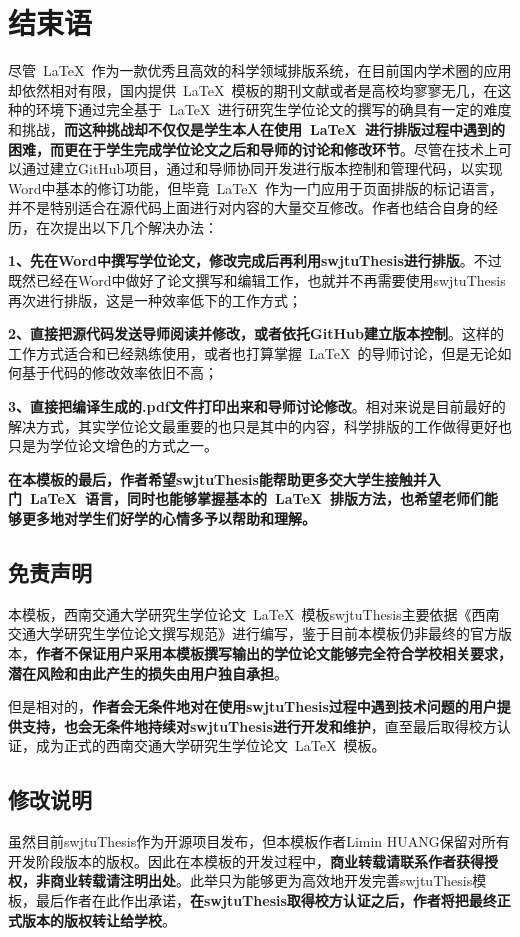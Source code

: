 \chapter{结束语}\label{第4章}

尽管~\LaTeX{}~作为一款优秀且高效的科学领域排版系统，在目前国内学术圈的应用却依然相对有限，国内提供~\LaTeX{}~模板的期刊文献或者是高校均寥寥无几，在这种的环境下通过完全基于~\LaTeX{}~进行研究生学位论文的撰写的确具有一定的难度和挑战，\textbf{而这种挑战却不仅仅是学生本人在使用~\LaTeX{}~进行排版过程中遇到的困难，而更在于学生完成学位论文之后和导师的讨论和修改环节}。尽管在技术上可以通过建立GitHub项目，通过和导师协同开发进行版本控制和管理代码，以实现Word中基本的修订功能，但毕竟~\LaTeX{}~作为一门应用于页面排版的标记语言，并不是特别适合在源代码上面进行对内容的大量交互修改。作者也结合自身的经历，在次提出以下几个解决办法：

\textbf{1、先在Word中撰写学位论文，修改完成后再利用swjtuThesis进行排版}。不过既然已经在Word中做好了论文撰写和编辑工作，也就并不再需要使用swjtuThesis再次进行排版，这是一种效率低下的工作方式；

\textbf{2、直接把源代码发送导师阅读并修改，或者依托GitHub建立版本控制}。这样的工作方式适合和已经熟练使用，或者也打算掌握~\LaTeX{}~的导师讨论，但是无论如何基于代码的修改效率依旧不高；

\textbf{3、直接把编译生成的.pdf文件打印出来和导师讨论修改}。相对来说是目前最好的解决方式，其实学位论文最重要的也只是其中的内容，科学排版的工作做得更好也只是为学位论文增色的方式之一。

\textbf{在本模板的最后，作者希望swjtuThesis能帮助更多交大学生接触并入门~\LaTeX{}~语言，同时也能够掌握基本的~\LaTeX{}~排版方法，也希望老师们能够更多地对学生们好学的心情多予以帮助和理解。}

\section{免责声明}
本模板，西南交通大学研究生学位论文~\LaTeX{}~模板swjtuThesis主要依据《西南交通大学研究生学位论文撰写规范》进行编写，鉴于目前本模板仍非最终的官方版本，\textbf{作者不保证用户采用本模板撰写输出的学位论文能够完全符合学校相关要求，潜在风险和由此产生的损失由用户独自承担}。

但是相对的，\textbf{作者会无条件地对在使用swjtuThesis过程中遇到技术问题的用户提供支持，也会无条件地持续对swjtuThesis进行开发和维护}，直至最后取得校方认证，成为正式的西南交通大学研究生学位论文~\LaTeX{}~模板。

\section{修改说明}
虽然目前swjtuThesis作为开源项目发布，但本模板作者Limin HUANG保留对所有开发阶段版本的版权。因此在本模板的开发过程中，\textbf{商业转载请联系作者获得授权，非商业转载请注明出处}。此举只为能够更为高效地开发完善swjtuThesis模板，最后作者在此作出承诺，\textbf{在swjtuThesis取得校方认证之后，作者将把最终正式版本的版权转让给学校}。